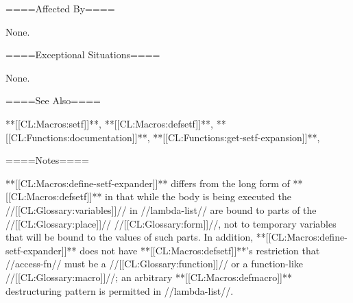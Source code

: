 ====Affected By====

None.

====Exceptional Situations====

None.

====See Also====

**[[CL:Macros:setf]]**, **[[CL:Macros:defsetf]]**, **[[CL:Functions:documentation]]**, **[[CL:Functions:get-setf-expansion]]**, {\secref\DocVsDecls}

====Notes====

**[[CL:Macros:define-setf-expander]]** differs from the long form of **[[CL:Macros:defsetf]]** in that while the body is being executed the //[[CL:Glossary:variables]]// in //lambda-list// are bound to parts of the //[[CL:Glossary:place]]// //[[CL:Glossary:form]]//, not to temporary variables that will be bound to the values of such parts. In addition, **[[CL:Macros:define-setf-expander]]** does not have **[[CL:Macros:defsetf]]**'s restriction that //access-fn// must be a //[[CL:Glossary:function]]// or a function-like //[[CL:Glossary:macro]]//; an arbitrary **[[CL:Macros:defmacro]]** destructuring pattern is permitted in //lambda-list//.

        
